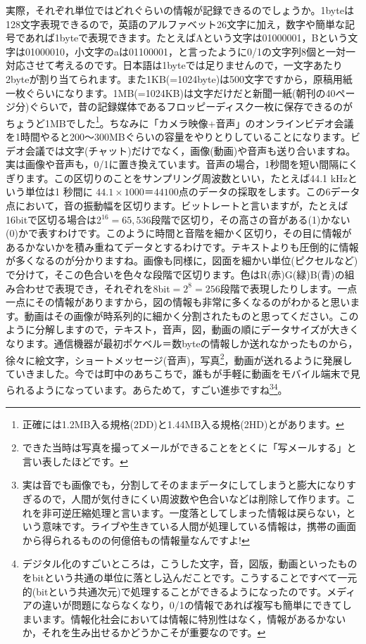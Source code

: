 \documentclass{ltjsbook}
\begin{document}
実際，それぞれ単位ではどれぐらいの情報が記録できるのでしょうか。1byteは128文字表現できるので，英語のアルファベット26文字に加え，数字や簡単な記号であれば1byteで表現できます。たとえばAという文字は01000001，Bという文字は01000010，小文字のaは01100001，と言ったように0/1の文字列8個と一対一対応させて考えるのです。日本語は1byteでは足りませんので，一文字あたり2byteが割り当てられます。また1KB(=1024byte)は500文字ですから，原稿用紙一枚ぐらいになります。1MB(=1024KB)は文字だけだと新聞一紙(朝刊の40ページ分)ぐらいで，昔の記録媒体であるフロッピーディスク一枚に保存できるのがちょうど1MBでした\footnote{正確には1.2MB入る規格(2DD)と1.44MB入る規格(2HD)とがあります。}。ちなみに「カメラ映像+音声」のオンラインビデオ会議を1時間やると200〜300MBぐらいの容量をやりとりしていることになります。ビデオ会議では文字(チャット)だけでなく，画像(動画)や音声も送り合いますね。実は画像や音声も，0/1に置き換えています。音声の場合，1秒間を短い間隔にくぎります。この区切りのことをサンプリング周波数といい，たとえば44.1 kHzという単位は1 秒間に $44.1 \times 1000 ＝ 44100$点のデータの採取をします。この6データ点において，音の振動幅を区切ります。ビットレートと言いますが，たとえば16bitで区切る場合は2$^16=65,536$段階で区切り，その高さの音がある(1)かない(0)かで表すわけです。このように時間と音階を細かく区切り，その目に情報があるかないかを積み重ねてデータとするわけです。テキストよりも圧倒的に情報が多くなるのが分かりますね。画像も同様に，図面を細かい単位(ピクセルなど)で分けて，そこの色合いを色々な段階で区切ります。色はR(赤)G(緑)B(青)の組み合わせで表現でき，それぞれを8bit$=2^8=256$段階で表現したりします。一点一点にその情報がありますから，図の情報も非常に多くなるのがわかると思います。動画はその画像が時系列的に細かく分割されたものと思ってください。このように分解しますので，テキスト，音声，図，動画の順にデータサイズが大きくなります。通信機器が最初ポケベル＝数byteの情報しか送れなかったものから，徐々に絵文字，ショートメッセージ(音声)，写真\footnote{できた当時は写真を撮ってメールができることをとくに「写メールする」と言い表したほどです。}，動画が送れるように発展していきました。今では町中のあちこちで，誰もが手軽に動画をモバイル端末で見られるようになっています。あらためて，すごい進歩ですね\footnote{実は音でも画像でも，分割してそのままデータにしてしまうと膨大になりすぎるので，人間が気付きにくい周波数や色合いなどは削除して作ります。これを非可逆圧縮処理と言います。一度落としてしまった情報は戻らない，という意味です。ライブや生きている人間が処理している情報は，携帯の画面から得られるものの何億倍もの情報量なんですよ!}\footnote{デジタル化のすごいところは，こうした文字，音，図版，動画といったものをbitという共通の単位に落とし込んだことです。こうすることですべて一元的(bitという共通次元)で処理することができるようになったのです。メディアの違いが問題にならなくなり，0/1の情報であれば複写も簡単にできてしまいます。情報化社会においては情報に特別性はなく，情報があるかないか，それを生み出せるかどうかこそが重要なのです。}。
\end{document}

